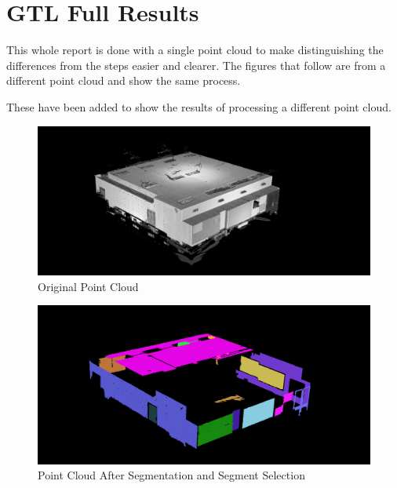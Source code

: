 \chapter{GTL Full Results}

This whole report is done with a single point cloud to make distinguishing the differences from the steps easier and clearer. The figures that follow are from a different point cloud and show the same process.

These have been added to show the results of processing a different point cloud.

\begin{figure}[H]
\centering
\includegraphics[width=1\linewidth]{Includes/images/Appendix/Before}
\caption{Original Point Cloud}
\label{fig:Before}
\end{figure}

\begin{figure}[H]
\centering
\includegraphics[width=1\linewidth]{Includes/images/Appendix/GTL-Full-seg}
\caption{Point Cloud After Segmentation and Segment Selection}
\label{fig:GTL-Full-seg}
\end{figure}

